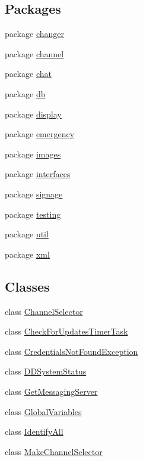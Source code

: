 \subsection*{Packages}
\begin{DoxyCompactItemize}
\item 
package \hyperlink{namespacegov_1_1fnal_1_1ppd_1_1dd_1_1changer}{changer}
\item 
package \hyperlink{namespacegov_1_1fnal_1_1ppd_1_1dd_1_1channel}{channel}
\item 
package \hyperlink{namespacegov_1_1fnal_1_1ppd_1_1dd_1_1chat}{chat}
\item 
package \hyperlink{namespacegov_1_1fnal_1_1ppd_1_1dd_1_1db}{db}
\item 
package \hyperlink{namespacegov_1_1fnal_1_1ppd_1_1dd_1_1display}{display}
\item 
package \hyperlink{namespacegov_1_1fnal_1_1ppd_1_1dd_1_1emergency}{emergency}
\item 
package \hyperlink{namespacegov_1_1fnal_1_1ppd_1_1dd_1_1images}{images}
\item 
package \hyperlink{namespacegov_1_1fnal_1_1ppd_1_1dd_1_1interfaces}{interfaces}
\item 
package \hyperlink{namespacegov_1_1fnal_1_1ppd_1_1dd_1_1signage}{signage}
\item 
package \hyperlink{namespacegov_1_1fnal_1_1ppd_1_1dd_1_1testing}{testing}
\item 
package \hyperlink{namespacegov_1_1fnal_1_1ppd_1_1dd_1_1util}{util}
\item 
package \hyperlink{namespacegov_1_1fnal_1_1ppd_1_1dd_1_1xml}{xml}
\end{DoxyCompactItemize}
\subsection*{Classes}
\begin{DoxyCompactItemize}
\item 
class \hyperlink{classgov_1_1fnal_1_1ppd_1_1dd_1_1ChannelSelector}{Channel\-Selector}
\item 
class \hyperlink{classgov_1_1fnal_1_1ppd_1_1dd_1_1CheckForUpdatesTimerTask}{Check\-For\-Updates\-Timer\-Task}
\item 
class \hyperlink{classgov_1_1fnal_1_1ppd_1_1dd_1_1CredentialsNotFoundException}{Credentials\-Not\-Found\-Exception}
\item 
class \hyperlink{classgov_1_1fnal_1_1ppd_1_1dd_1_1DDSystemStatus}{D\-D\-System\-Status}
\item 
class \hyperlink{classgov_1_1fnal_1_1ppd_1_1dd_1_1GetMessagingServer}{Get\-Messaging\-Server}
\item 
class \hyperlink{classgov_1_1fnal_1_1ppd_1_1dd_1_1GlobalVariables}{Global\-Variables}
\item 
class \hyperlink{classgov_1_1fnal_1_1ppd_1_1dd_1_1IdentifyAll}{Identify\-All}
\item 
class \hyperlink{classgov_1_1fnal_1_1ppd_1_1dd_1_1MakeChannelSelector}{Make\-Channel\-Selector}
\end{DoxyCompactItemize}
